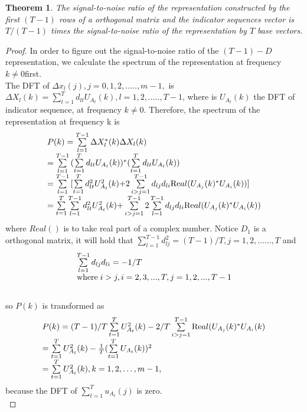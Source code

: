 \documentclass[preprint,authoryear,12pt]{elsarticle}
\newtheorem{thm}{Theorem}[section]
\begin{document}
\begin{thm}
The signal-to-noise ratio of the representation constructed by the first $(T-1)$ rows of a orthogonal matrix and the indicator sequences vector is $T/(T-1)$ times the signal-to-noise ratio of the representation by $T$ base vectors.\\
\end{thm}
\begin{proof}
In order to figure out the signal-to-noise ratio of the $(T-1)-D$ representation, we calculate the spectrum of the representation at frequency  $k\neq0$first.\\
The DFT of $\Delta x_l (j),j = 0,1,2,.....,m - 1,$ is $\Delta X_l (k) = \sum\limits_{t = 1}^T {d_{lt} U_{A_t}(k)} ,l = 1,2,.....,T - 1$, where is $U_{A_t}(k)$ the DFT of indicator sequence, at frequency ${k\neq0}$. Therefore, the spectrum of the representation at frequency k  is
$$
\begin{array}{l}
 P(k) = \sum\limits_{l = 1}^{T - 1} {\Delta X_l ^* (k)\Delta X_l (k)}  \\
  = \sum\limits_{l = 1}^{T - 1} {(\sum\limits_{t = 1}^T {d_{lt} U_{A_t} (k)} )^* (\sum\limits_{t = 1}^T {d_{lt} U_{A_t}(k)} )}  \\
  = \sum\limits_{l = 1}^{T - 1} {[\sum\limits_{t = 1}^T {d_{lt} ^2 U_{A_t} ^2 (k) + } } 2\sum\limits_{i > j = 1}^{T - 1} {d_{lj} d_{li} {\mathop{\rm Re}\nolimits} al(} U_{A_j } (k)^* U_{A_i } (k))] \\
  = \sum\limits_{t = 1}^T {\sum\limits_{l = 1}^{T - 1} {d_{lt} ^2 U_{A_t} ^2 (k ) + } } \sum\limits_{i > j = 1}^{T - 1} 2\sum\limits_{l = 1}^{T - 1} {d_{lj} d_{li} {\mathop{\rm Re}\nolimits} al(} U_{A_j } (k)^* U_{A_i } (k)) \\
 \end{array}
$$
where $Real()$ is to take real part of a complex number. Notice $D_1$ is a orthogonal matrix, it will hold that $\sum\limits_{l = 1}^{T - 1} {d^2 _{lj} }  = (T - 1)/T,j = 1,2,......,T$ and $$\begin{array}{l}
 \sum\limits_{l = 1}^{T - 1} {d_{lj} d_{li} }  =  - 1/T\\
 {\rm{where}}\;i > j,i = 2,3,...,T,j = 1,2,...,T - 1 \\
 \end{array}$$ \\
 so $P(k)$ is transformed as\\
 $$
\begin{array}{l}
 P(k) = (T - 1)/T\sum\limits_{t = 1}^T {U_{A_t} ^2 (k)}  - 2/T\sum\limits_{i > j = 1}^{T - 1} {{\mathop{\rm Re}\nolimits} al(U_{A_j } (k)^* U_{A_i } } (k) \\
  = \sum\limits_{t = 1}^T {U^2 _{A_t } (k)}  - \frac{1}{T}(\sum\limits_{t = 1}^T {U_{A_t } (k)} )^2 \\
  = \sum\limits_{t = 1}^T {U_{A_t} ^2 (k )} ,k = 1,2, \ldots ,m - 1, \\
 \end{array}
$$
because the DFT of $\sum\limits_{t = 1}^T {u_{A_t} (j)} $ is zero.\\


\end{proof}
\end{document}
